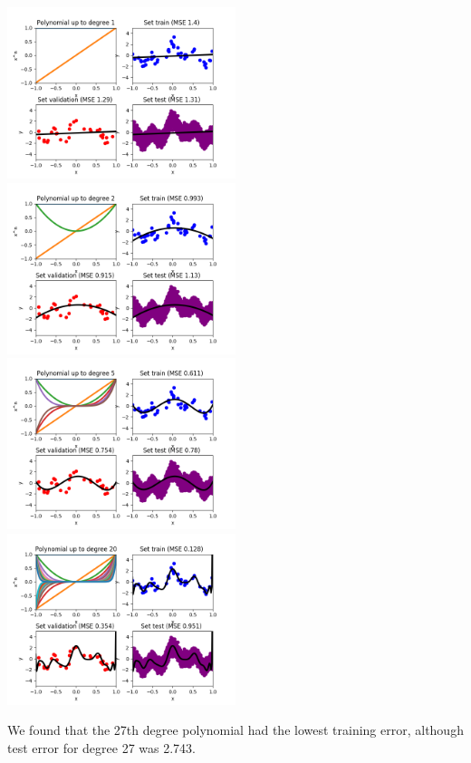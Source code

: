 \documentclass[a4paper]{article}
\begin{document}
\noindent
\includegraphics[width=0.5\textwidth]{linreg_deg1.png}%
\includegraphics[width=0.5\textwidth]{linreg_deg2.png}\\[2em]
\includegraphics[width=0.5\textwidth]{linreg_deg5.png}%
\includegraphics[width=0.5\textwidth]{linreg_deg20.png}\par

We found that the 27th degree polynomial had the lowest training error, although test error for degree 27 was 2.743.
\end{document}
